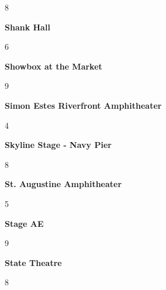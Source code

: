 \begin{center}8\end{center} 
\newline 
\begin{center}\textbf{Shank Hall}\end{center}
\begin{center}6\end{center} 
\newline 
\begin{center}\textbf{Showbox at the Market}\end{center}
\begin{center}9\end{center} 
\newline 
\begin{center}\textbf{Simon Estes Riverfront Amphitheater}\end{center}
\begin{center}4\end{center} 
\newline 
\begin{center}\textbf{Skyline Stage - Navy Pier}\end{center}
\begin{center}8\end{center} 
\newline 
\begin{center}\textbf{St. Augustine Amphitheater}\end{center}
\begin{center}5\end{center} 
\newline 
\begin{center}\textbf{Stage AE}\end{center}
\begin{center}9\end{center} 
\newline 
\begin{center}\textbf{State Theatre}\end{center}
\begin{center}8\end{center} 
